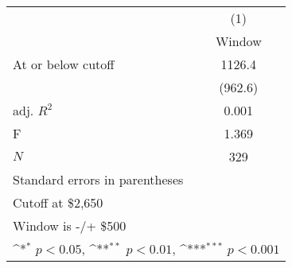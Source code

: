 {
\def\sym#1{\ifmmode^{#1}\else\(^{#1}\)\fi}
\begin{tabular}{l*{1}{c}}
\hline\hline
            &\multicolumn{1}{c}{(1)}\\
            &\multicolumn{1}{c}{Window}\\
\hline
At or below cutoff&      1126.4         \\
            &     (962.6)         \\
\hline
adj. \(R^{2}\)&       0.001         \\
F           &       1.369         \\
\(N\)       &         329         \\
\hline\hline
\multicolumn{2}{l}{\footnotesize Standard errors in parentheses}\\
\multicolumn{2}{l}{\footnotesize Cutoff at \$2,650}\\
\multicolumn{2}{l}{\footnotesize Window is -/+ \$500}\\
\multicolumn{2}{l}{\footnotesize \sym{*} \(p<0.05\), \sym{**} \(p<0.01\), \sym{***} \(p<0.001\)}\\
\end{tabular}
}
